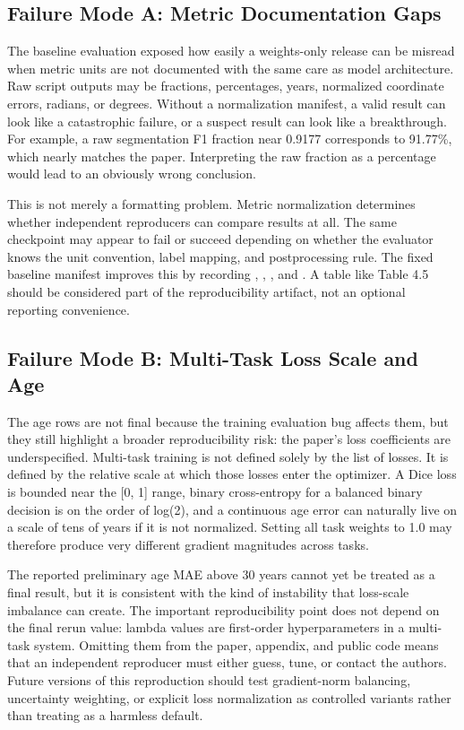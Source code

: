 \documentclass[11pt]{article}
\begin{document}
\subsection{Failure Mode A: Metric Documentation Gaps}


The baseline evaluation exposed how easily a weights-only release can be misread when metric units are not documented with the same care as model architecture. Raw script outputs may be fractions, percentages, years, normalized coordinate errors, radians, or degrees. Without a normalization manifest, a valid result can look like a catastrophic failure, or a suspect result can look like a breakthrough. For example, a raw segmentation F1 fraction near 0.9177 corresponds to 91.77\%, which nearly matches the paper. Interpreting the raw fraction as a percentage would lead to an obviously wrong conclusion.


This is not merely a formatting problem. Metric normalization determines whether independent reproducers can compare results at all. The same checkpoint may appear to fail or succeed depending on whether the evaluator knows the unit convention, label mapping, and postprocessing rule. The fixed baseline manifest improves this by recording , , , and . A table like Table 4.5 should be considered part of the reproducibility artifact, not an optional reporting convenience.


\subsection{Failure Mode B: Multi-Task Loss Scale and Age}


The age rows are not final because the training evaluation bug affects them, but they still highlight a broader reproducibility risk: the paper's loss coefficients are underspecified. Multi-task training is not defined solely by the list of losses. It is defined by the relative scale at which those losses enter the optimizer. A Dice loss is bounded near the [0, 1] range, binary cross-entropy for a balanced binary decision is on the order of log(2), and a continuous age error can naturally live on a scale of tens of years if it is not normalized. Setting all task weights to 1.0 may therefore produce very different gradient magnitudes across tasks.


The reported preliminary age MAE above 30 years cannot yet be treated as a final result, but it is consistent with the kind of instability that loss-scale imbalance can create. The important reproducibility point does not depend on the final rerun value: lambda values are first-order hyperparameters in a multi-task system. Omitting them from the paper, appendix, and public code means that an independent reproducer must either guess, tune, or contact the authors. Future versions of this reproduction should test gradient-norm balancing, uncertainty weighting, or explicit loss normalization as controlled variants rather than treating  as a harmless default.
\end{document}
